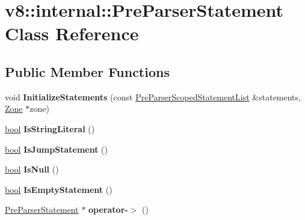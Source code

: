 \hypertarget{classv8_1_1internal_1_1PreParserStatement}{}\section{v8\+:\+:internal\+:\+:Pre\+Parser\+Statement Class Reference}
\label{classv8_1_1internal_1_1PreParserStatement}
\subsection*{Public Member Functions}
\begin{DoxyCompactItemize}
\item 
\mbox{\label{classv8_1_1internal_1_1PreParserStatement_aabee3e81a44d490b846f8e587ff178a3}} 
void {\bfseries Initialize\+Statements} (const \mbox{\hyperlink{classv8_1_1internal_1_1PreParserScopedStatementList}{Pre\+Parser\+Scoped\+Statement\+List}} \&statements, \mbox{\hyperlink{classv8_1_1internal_1_1Zone}{Zone}} $\ast$zone)
\item 
\mbox{\label{classv8_1_1internal_1_1PreParserStatement_aab47f7768a864f9c66b066961e2b717c}} 
\mbox{\hyperlink{classbool}{bool}} {\bfseries Is\+String\+Literal} ()
\item 
\mbox{\label{classv8_1_1internal_1_1PreParserStatement_ab1e7081bc53eb7aca8b1b2b16a75ed02}} 
\mbox{\hyperlink{classbool}{bool}} {\bfseries Is\+Jump\+Statement} ()
\item 
\mbox{\label{classv8_1_1internal_1_1PreParserStatement_a4ae89bb1c614b58926739a0b5d7554de}} 
\mbox{\hyperlink{classbool}{bool}} {\bfseries Is\+Null} ()
\item 
\mbox{\label{classv8_1_1internal_1_1PreParserStatement_ad78009dcb7a5dcc18bc1a4f0a96c102e}} 
\mbox{\hyperlink{classbool}{bool}} {\bfseries Is\+Empty\+Statement} ()
\item 
\mbox{\label{classv8_1_1internal_1_1PreParserStatement_a57e6701b998d51829325d47a9b7056f4}} 
\mbox{\hyperlink{classv8_1_1internal_1_1PreParserStatement}{Pre\+Parser\+Statement}} $\ast$ {\bfseries operator-\/$>$} ()

\end{DoxyCompactItemize}
